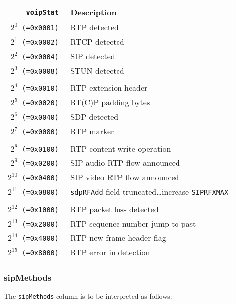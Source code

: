 \documentclass[documentation]{subfiles}
\begin{document}
\begin{longtable}{>{\tt}rl}
    \toprule
    {\bf voipStat}     & {\bf Description}\\
    \midrule\endhead%
    $2^{0}$  (=0x0001) & RTP detected\\
    $2^{1}$  (=0x0002) & RTCP detected\\
    $2^{2}$  (=0x0004) & SIP detected\\
    $2^{3}$  (=0x0008) & STUN detected\\
    \\
    $2^{4}$  (=0x0010) & RTP extension header\\
    $2^{5}$  (=0x0020) & RT(C)P padding bytes\\
    $2^{6}$  (=0x0040) & SDP detected\\
    $2^{7}$  (=0x0080) & RTP marker\\
    \\
    $2^{8}$  (=0x0100) & RTP content write operation \\
    $2^{9}$  (=0x0200) & SIP audio RTP flow announced\\
    $2^{10}$ (=0x0400) & SIP video RTP flow announced\\
    $2^{11}$ (=0x0800) & {\tt sdpRFAdd} field truncated\ldots increase {\tt SIPRFXMAX}\\
    \\
    $2^{12}$ (=0x1000) & RTP packet loss detected\\
    $2^{13}$ (=0x2000) & RTP sequence number jump to past\\
    $2^{14}$ (=0x4000) & RTP new frame header flag\\
    $2^{15}$ (=0x8000) & RTP error in detection\\
    \bottomrule
\end{longtable}

\subsubsection{sipMethods}\label{sipMethods}
The {\tt sipMethods} column is to be interpreted as follows:
\end{document}
